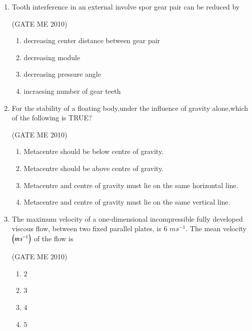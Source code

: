 \documentclass[journal,12pt,onecolumn]{IEEEtran}
\theoremstyle{remark}
\begin{document}
\begin{enumerate}
 \hfill{(GATE ME 2010)}

 
\begin{multicols}{4}
\begin{enumerate}
\item $\omega_{n}$
\item 0.408$\omega_{n}$
\item 0.204$\omega_{n}$
\item 0.167$\omega_{n}$
\end{enumerate}
\end{multicols}

\item Tooth interference in an external involve spor gear pair can be reduced by

 \hfill{(GATE ME 2010)}

\begin{enumerate}
\item decreasing center distance between gear pair
\item decreasing module 
\item decreasing pressure angle 
\item incraesing number of gear teeth
\end{enumerate}
 

\item For the stability of a floating body,under the influence of gravity alone,which of the following is TRUE?

  \hfill{(GATE ME 2010)}
  
    \begin{enumerate}
        \item Metacentre should be below centre of gravity.
\item Metacentre should be above centre of gravity.
\item Metacentre and centre of gravity must lie on the same horizontal line.
\item Metacentre and centre of gravity must lie on the same vertical line.
    \end{enumerate}
 


\item The maximum velocity of a one-dimensional incompressible fully developed viscous flow, between two fixed parallel plates, is 6 $ms^{-1}$. The mean velocity $\left(ms^{-1}\right)$ of the flow is

 \hfill{(GATE ME 2010)}

\begin{multicols}{4}
    \begin{enumerate}
        \item  $2$
        \item $3$
        \item $4$
        \item $5$
    \end{enumerate}
\end{multicols}


\end{enumerate}
\end{document}
